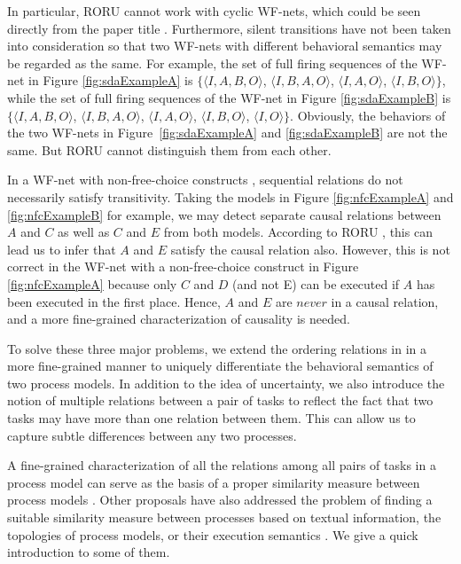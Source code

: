 \documentclass{llncs}
\begin{document}
In particular, RORU cannot work with cyclic WF-nets, which could be seen directly from the paper title \cite{jin2014computing}. Furthermore, silent transitions have not been taken into consideration so that two WF-nets with different behavioral semantics may be regarded as the same. For example, the set of full firing sequences of the WF-net in Figure \ref{fig:sdaExampleA} is $\{\langle I,A,B,O\rangle$, $\langle I,B,A,O\rangle$, $\langle I,A,O\rangle$, $\langle I,B,O\rangle\}$, while the set of full firing sequences of the WF-net in Figure \ref{fig:sdaExampleB} is $\{\langle I,A,B,O\rangle$, $\langle I,B,A,O\rangle$, $\langle I,A,O\rangle$, $\langle I,B,O\rangle$, $\langle I,O\rangle\}$. Obviously, the behaviors of the two WF-nets in Figure~\ref{fig:sdaExampleA} and \ref{fig:sdaExampleB} are not the same. But RORU cannot distinguish them from each other.

In a WF-net with non-free-choice constructs \cite{de2003workflow}, sequential relations do not necessarily satisfy transitivity. Taking the models in Figure \ref{fig:nfcExampleA} and \ref{fig:nfcExampleB} for example, we may detect separate causal relations between $A$ and $C$ as well as $C$ and $E$ from both models. According to RORU \cite{jin2014computing}, this can lead us to infer that $A$ and $E$ satisfy the causal relation also. However, this is not correct in the WF-net with a non-free-choice construct in Figure \ref{fig:nfcExampleA} because only $C$ and $D$ (and not E) can be executed if $A$ has been executed in the first place. Hence, $A$ and $E$ are $never$ in a causal relation, and a more fine-grained characterization of causality is needed. 

To solve these three major problems, we extend the ordering relations in \cite{jin2014computing} in a more fine-grained manner to uniquely differentiate the behavioral semantics of two process models. In addition to the idea of uncertainty, we also introduce the notion of multiple relations between a pair of tasks to reflect the fact that two tasks may have more than one relation between them.  This can allow us to capture subtle differences between any two processes.

A fine-grained characterization of all the relations among all pairs of tasks in a process model can serve as the basis of a proper similarity measure between process models \cite{dijkman2014managing}. Other proposals have also addressed the problem of finding a suitable similarity measure between processes based on textual information, the topologies of process models, or their execution semantics \cite{weidlich2011efficient}. We give a quick introduction to some of them.
\end{document}
